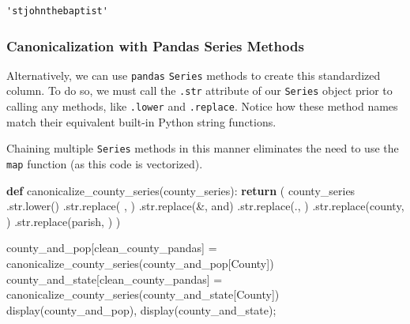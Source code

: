 \documentclass[
  letterpaper,
  DIV=11,
  numbers=noendperiod]{scrreprt}
\newenvironment{Shaded}{\begin{snugshade}}{\end{snugshade}}
\newcommand{\BuiltInTok}[1]{\textcolor[rgb]{0.00,0.23,0.31}{#1}}
\newcommand{\ControlFlowTok}[1]{\textcolor[rgb]{0.00,0.23,0.31}{\textbf{#1}}}
\newcommand{\KeywordTok}[1]{\textcolor[rgb]{0.00,0.23,0.31}{\textbf{#1}}}
\newcommand{\NormalTok}[1]{\textcolor[rgb]{0.00,0.23,0.31}{#1}}
\newcommand{\OperatorTok}[1]{\textcolor[rgb]{0.37,0.37,0.37}{#1}}
\newcommand{\StringTok}[1]{\textcolor[rgb]{0.13,0.47,0.30}{#1}}
\begin{document}
\begin{verbatim}
'stjohnthebaptist'
\end{verbatim}

\subsubsection{Canonicalization with Pandas Series
Methods}\label{canonicalization-with-pandas-series-methods}

Alternatively, we can use \texttt{pandas} \texttt{Series} methods to
create this standardized column. To do so, we must call the
\texttt{.str} attribute of our \texttt{Series} object prior to calling
any methods, like \texttt{.lower} and \texttt{.replace}. Notice how
these method names match their equivalent built-in Python string
functions.

Chaining multiple \texttt{Series} methods in this manner eliminates the
need to use the \texttt{map} function (as this code is vectorized).

\begin{Shaded}
\begin{Highlighting}[]
\KeywordTok{def}\NormalTok{ canonicalize\_county\_series(county\_series):}
    \ControlFlowTok{return}\NormalTok{ (}
\NormalTok{        county\_series}
\NormalTok{            .}\BuiltInTok{str}\NormalTok{.lower()}
\NormalTok{            .}\BuiltInTok{str}\NormalTok{.replace(}\StringTok{\textquotesingle{} \textquotesingle{}}\NormalTok{, }\StringTok{\textquotesingle{}\textquotesingle{}}\NormalTok{)}
\NormalTok{            .}\BuiltInTok{str}\NormalTok{.replace(}\StringTok{\textquotesingle{}\&\textquotesingle{}}\NormalTok{, }\StringTok{\textquotesingle{}and\textquotesingle{}}\NormalTok{)}
\NormalTok{            .}\BuiltInTok{str}\NormalTok{.replace(}\StringTok{\textquotesingle{}.\textquotesingle{}}\NormalTok{, }\StringTok{\textquotesingle{}\textquotesingle{}}\NormalTok{)}
\NormalTok{            .}\BuiltInTok{str}\NormalTok{.replace(}\StringTok{\textquotesingle{}county\textquotesingle{}}\NormalTok{, }\StringTok{\textquotesingle{}\textquotesingle{}}\NormalTok{)}
\NormalTok{            .}\BuiltInTok{str}\NormalTok{.replace(}\StringTok{\textquotesingle{}parish\textquotesingle{}}\NormalTok{, }\StringTok{\textquotesingle{}\textquotesingle{}}\NormalTok{)}
\NormalTok{    )}

\NormalTok{county\_and\_pop[}\StringTok{\textquotesingle{}clean\_county\_pandas\textquotesingle{}}\NormalTok{] }\OperatorTok{=}\NormalTok{ canonicalize\_county\_series(county\_and\_pop[}\StringTok{\textquotesingle{}County\textquotesingle{}}\NormalTok{])}
\NormalTok{county\_and\_state[}\StringTok{\textquotesingle{}clean\_county\_pandas\textquotesingle{}}\NormalTok{] }\OperatorTok{=}\NormalTok{ canonicalize\_county\_series(county\_and\_state[}\StringTok{\textquotesingle{}County\textquotesingle{}}\NormalTok{])}
\NormalTok{display(county\_and\_pop), display(county\_and\_state)}\OperatorTok{;}
\end{Highlighting}
\end{Shaded}
\end{document}
